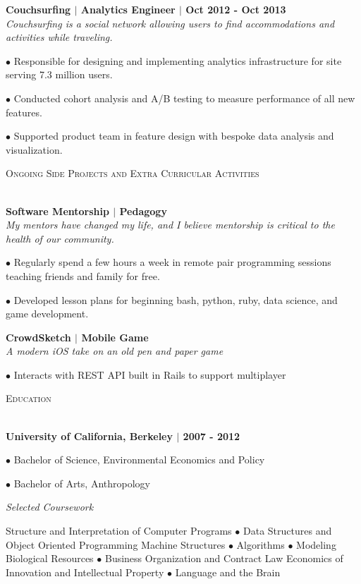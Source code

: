 \documentclass{article}
\newcommand{\lineunder}{\vspace*{-8pt} \\ \hspace*{-18pt} \hrulefill \\}
\newcommand{\header}[1]{{\hspace*{-15pt}\vspace*{6pt} \textsc{#1}} \vspace*{-6pt} \lineunder}
\begin{document}
\begin{description}
	 \item \textbf{Couchsurfing $|$ Analytics Engineer $|$ Oct 2012 - Oct 2013} \\
	  \textit{Couchsurfing is a social network allowing users to find accommodations and activities while traveling.}
	 \item$\bullet$ Responsible for designing and implementing analytics infrastructure for site serving 7.3 million users.
	 \item$\bullet$ Conducted cohort analysis and A/B testing to measure performance of all new features.
	 \item$\bullet$ Supported product team in feature design with bespoke data analysis and visualization.
	 
	 
	\end{description}

\header{Ongoing Side Projects and Extra Curricular Activities}

\begin{description}
 \item \textbf{Software Mentorship $|$ Pedagogy } \\
 \textit{My mentors have changed my life, and I believe mentorship is critical to the health of our community. }  
 \item$\bullet$ Regularly spend a few hours a week in remote pair programming sessions teaching friends and family for free.
 \item$\bullet$ Developed lesson plans for beginning bash, python, ruby, data science, and game development.
 
 \item \textbf{CrowdSketch $|$ Mobile Game } \\
 \textit{A modern iOS take on an old pen and paper game}
 \item$\bullet$ Interacts with REST API built in Rails to support multiplayer
 
\end{description}


\header{Education}
\begin{description}
 \item \textbf{University of California, Berkeley $|$ 2007 - 2012}
 \item$\bullet$ Bachelor of Science, Environmental Economics and Policy
 \item$\bullet$ Bachelor of Arts, Anthropology
 \begin{center}
\textit{Selected Coursework}
 \item {Structure and Interpretation of Computer Programs} $\bullet$ {Data Structures and Object Oriented Programming}
 {Machine Structures} $\bullet$ {Algorithms} $\bullet$ {Modeling Biological Resources} $\bullet$ {Business Organization and Contract Law}
 {Economics of Innovation and Intellectual Property} $\bullet$ {Language and the Brain}
 
 \end{center}
 
\end{description}
\end{document}
